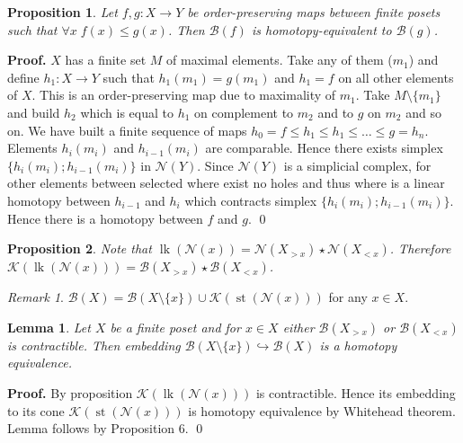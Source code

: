 \documentclass[a4paper, 12pt]{article}
\newtheorem{proposition}{Proposition}
\newtheorem{lemma}{Lemma}
\theoremstyle{definition}
\theoremstyle{remark}
\newtheorem{remark}{Remark}
\newenvironment{pf}{\noindent\textbf{Proof.}}{\qed}
\renewcommand{\leq}{\leqslant}
\begin{document}
\begin{proposition} {\cite[Proposition 2.2]{Bar11}}
  Let $f,g : X \to Y$ be order-preserving maps between finite posets such that $\forall x\;f(x) \leq g(x)$. Then $\mathcal{B}(f)$ is homotopy-equivalent to $\mathcal{B}(g)$.
\end{proposition}

\begin{pf}
  $X$ has a finite set $M$ of maximal elements. Take any of them ($m_1$) and define $h_1 : X \to Y$ such that $h_1(m_1) = g(m_1)$ and $h_1 = f$ on all other elements of $X$. This is an order-preserving map due to maximality of $m_1$. Take $M \setminus \{m_1\}$ and build $h_2$ which is equal to $h_1$ on complement to $m_2$ and to $g$ on $m_2$ and so on. We have built a finite sequence of maps $h_0 = f \leq h_1 \leq h_1 \leq \ldots \leq g = h_n$.\\

  Elements $h_i(m_i)$ and $h_{i-1}(m_i)$ are comparable. Hence there exists simplex $\{h_i(m_i); h_{i-1}(m_i)\}$ in $\mathcal{N}(Y)$. Since $\mathcal{N}(Y)$ is a simplicial complex, for other elements between selected where exist no holes and thus where is a linear homotopy between $h_{i-1}$ and $h_{i}$ which contracts simplex $\{h_i(m_i); h_{i-1}(m_i)\}$.\\

  Hence there is a homotopy between $f$ and $g$.
\end{pf}

\begin{proposition}
  Note that $\operatorname{lk}(\mathcal{N}(x)) = \mathcal{N}(X_{>x}) \star \mathcal{N}(X_{<x})$. Therefore $\mathcal{K}(\operatorname{lk}(\mathcal{N}(x))) = \mathcal{B}(X_{>x}) \star \mathcal{B}(X_{<x})$.
\end{proposition}

\begin{remark}
  $\mathcal{B}(X) = \mathcal{B}(X \setminus \{x\}) \cup \mathcal{K}(\operatorname{st}(\mathcal{N}(x)))$ for any $x \in X$.\\
\end{remark}

\begin{lemma}
  Let $X$ be a finite poset and for $x \in X$ either $\mathcal{B}(X_{>x})$ or $\mathcal{B}(X_{<x})$ is contractible. Then embedding $\mathcal{B}(X \setminus \{x\}) \hookrightarrow \mathcal{B}(X)$ is a homotopy equivalence.
\end{lemma}

\begin{pf}
  By proposition $\mathcal{K}(\operatorname{lk}(\mathcal{N}(x)))$ is contractible. Hence its embedding to its cone $\mathcal{K}(\operatorname{st}(\mathcal{N}(x)))$ is homotopy equivalence by Whitehead theorem. Lemma follows by Proposition 6.
\end{pf}
\end{document}
